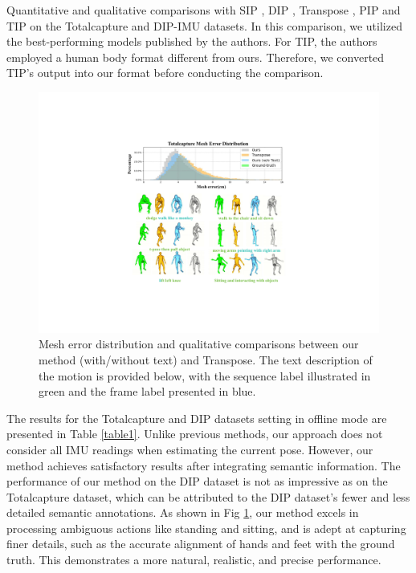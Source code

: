 \documentclass[letterpaper]{article} %
\begin{document}
Quantitative and qualitative comparisons with SIP \cite{von2017sparse}, DIP \cite{huang2018deep}, Transpose \cite{yi2021transpose}, PIP \cite{yi2022physical} and TIP \cite{jiang2022transformer} on the Totalcapture and DIP-IMU datasets. In this comparison, we utilized the best-performing models published by the authors. For TIP, the authors employed a human body format different from ours. Therefore, we converted TIP's output into our format before conducting the comparison.
\begin{figure}[h]
\centering
\includegraphics[width=\columnwidth]{Mesh_err.pdf}
\caption{Mesh error distribution and qualitative comparisons between our method (with/without text) and Transpose. The text description of the motion is provided below, with the sequence label illustrated in green and the frame label presented in blue.}
\label{fig5}
\end{figure}
The results for the Totalcapture and DIP datasets setting in offline mode are presented in Table \ref{table1}.
Unlike previous methods, our approach does not consider all IMU readings when estimating the current pose. However, our method achieves satisfactory results after integrating semantic information. The performance of our method on the DIP dataset is not as impressive as on the Totalcapture dataset, which can be attributed to the DIP dataset's fewer and less detailed semantic annotations.
As shown in Fig \ref{fig5}, our method excels in processing ambiguous actions like standing and sitting, and is adept at capturing finer details, such as the accurate alignment of hands and feet with the ground truth. This demonstrates a more natural, realistic, and precise performance.
\end{document}
